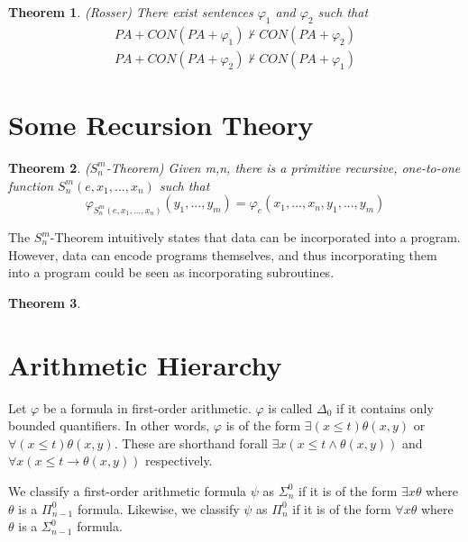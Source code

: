 \documentclass[a4paper,10pt]{article}
\newenvironment{definition}[1][Definition]{\begin{trivlist}
\item[\hskip \labelsep {\bfseries #1}]}{\end{trivlist}}
\newtheorem{theorem}{Theorem}[section]
\let\phi\varphi
\newcommand*\map{\rightarrow}
\newcommand*\prf{\vdash}
\begin{document}
  \begin{theorem}
   (Rosser)
   There exist sentences $\phi_1$ and $\phi_2$ such that 
   \begin{gather*}
    PA + CON(PA + \phi_1) \not\prf CON(PA + \phi_2) \\ 
    PA + CON(PA + \phi_2) \not\prf CON(PA + \phi_1)
   \end{gather*}
  \end{theorem}

   \newpage
   \section{Some Recursion Theory}
   
   \begin{theorem}
   ($S_n^m$-Theorem)
    Given m,n, there is a primitive recursive, one-to-one function $S_n^m(e,x_1,...,x_n)$ such that
    \begin{equation*}
      \phi_{S_n^m(e,x_1,...,x_n)}(y_1,...,y_m) = \phi_e(x_1,...,x_n,y_1,...,y_m)
    \end{equation*}
   \end{theorem}

   The $S_n^m$-Theorem intuitively states that data can be incorporated into a program. However, data can encode programs themselves, and thus incorporating them into a program could be seen as incorporating subroutines.
    
   \begin{theorem}
    
   \end{theorem}
 
    
    
    
   \newpage
   \section{Arithmetic Hierarchy}
   
    \begin{definition}
    Let $\phi$ be a formula in first-order arithmetic. $\phi$ is called $\Delta_0$ if it contains only bounded quantifiers. In other words, $\phi$ is of the form $\exists(x \leq t)\theta(x,y)$ or $\forall(x \leq t)\theta(x,y)$. These are shorthand forall
    $\exists x (x \leq t \land \theta(x,y))$ and $\forall x (x \leq t \map \theta(x,y))$ respectively.
    \end{definition}

    \begin{definition}
      We classify a first-order arithmetic formula $\psi$ as $\Sigma_n^0$ if it is of the form $\exists x \theta$ where $\theta$ is a $\Pi_{n-1}^0$ formula. Likewise, we classify $\psi$ as $\Pi_{n}^0$
      if it is of the form $\forall x \theta$ where $\theta$ is a $\Sigma_{n-1}^0$ formula.
    \end{definition}
    
\end{document}
